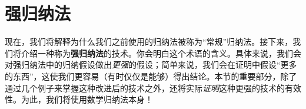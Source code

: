 \section{强归纳法}

现在，我们将解释为什么我们之前使用的归纳法被称为``常规''归纳法。接下来，我们将介绍一种称为\textbf{强归纳法}的技术。你会明白这个术语的含义。具体来说，我们会对强归纳法中的归纳假设做出\emph{更强}的假设；简单来说，我们会在证明中假设``更多的东西''，这使我们更容易（有时仅仅是能够）得出结论。本节的重要部分，除了通过几个例子来掌握这种改进后的技术之外，还将实际\emph{证明}这种更强的技术的有效性。为此，我们将使用数学归纳法本身！











